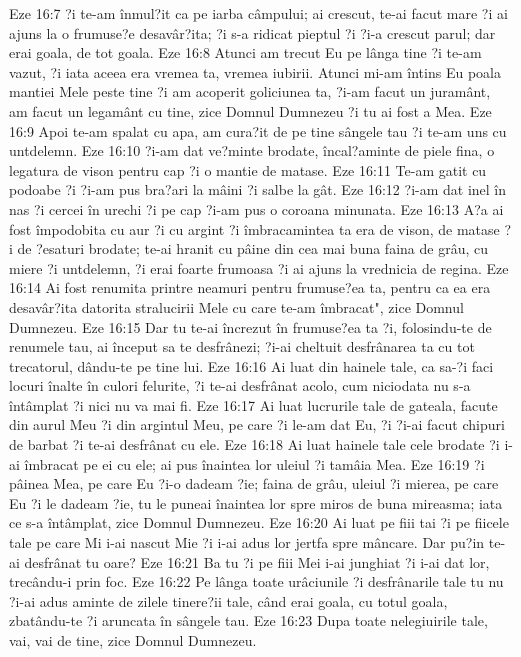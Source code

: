 Eze 16:7  ?i te-am înmul?it ca pe iarba câmpului; ai crescut, te-ai facut mare ?i ai ajuns la o frumuse?e desavâr?ita; ?i s-a ridicat pieptul ?i ?i-a crescut parul; dar erai goala, de tot goala.
Eze 16:8  Atunci am trecut Eu pe lânga tine ?i te-am vazut, ?i iata aceea era vremea ta, vremea iubirii. Atunci mi-am întins Eu poala mantiei Mele peste tine ?i am acoperit goliciunea ta, ?i-am facut un juramânt, am facut un legamânt cu tine, zice Domnul Dumnezeu ?i tu ai fost a Mea.
Eze 16:9  Apoi te-am spalat cu apa, am cura?it de pe tine sângele tau ?i te-am uns cu untdelemn.
Eze 16:10  ?i-am dat ve?minte brodate, încal?aminte de piele fina, o legatura de vison pentru cap ?i o mantie de matase.
Eze 16:11  Te-am gatit cu podoabe ?i ?i-am pus bra?ari la mâini ?i salbe la gât.
Eze 16:12  ?i-am dat inel în nas ?i cercei în urechi ?i pe cap ?i-am pus o coroana minunata.
Eze 16:13  A?a ai fost împodobita cu aur ?i cu argint ?i îmbracamintea ta era de vison, de matase ?i de ?esaturi brodate; te-ai hranit cu pâine din cea mai buna faina de grâu, cu miere ?i untdelemn, ?i erai foarte frumoasa ?i ai ajuns la vrednicia de regina.
Eze 16:14  Ai fost renumita printre neamuri pentru frumuse?ea ta, pentru ca ea era desavâr?ita datorita stralucirii Mele cu care te-am îmbracat", zice Domnul Dumnezeu.
Eze 16:15  Dar tu te-ai încrezut în frumuse?ea ta ?i, folosindu-te de renumele tau, ai început sa te desfrânezi; ?i-ai cheltuit desfrânarea ta cu tot trecatorul, dându-te pe tine lui.
Eze 16:16  Ai luat din hainele tale, ca sa-?i faci locuri înalte în culori felurite, ?i te-ai desfrânat acolo, cum niciodata nu s-a întâmplat ?i nici nu va mai fi.
Eze 16:17  Ai luat lucrurile tale de gateala, facute din aurul Meu ?i din argintul Meu, pe care ?i le-am dat Eu, ?i ?i-ai facut chipuri de barbat ?i te-ai desfrânat cu ele.
Eze 16:18  Ai luat hainele tale cele brodate ?i i-ai îmbracat pe ei cu ele; ai pus înaintea lor uleiul ?i tamâia Mea.
Eze 16:19  ?i pâinea Mea, pe care Eu ?i-o dadeam ?ie; faina de grâu, uleiul ?i mierea, pe care Eu ?i le dadeam ?ie, tu le puneai înaintea lor spre miros de buna mireasma; iata ce s-a întâmplat, zice Domnul Dumnezeu.
Eze 16:20  Ai luat pe fiii tai ?i pe fiicele tale pe care Mi i-ai nascut Mie ?i i-ai adus lor jertfa spre mâncare. Dar pu?in te-ai desfrânat tu oare?
Eze 16:21  Ba tu ?i pe fiii Mei i-ai junghiat ?i i-ai dat lor, trecându-i prin foc.
Eze 16:22  Pe lânga toate urâciunile ?i desfrânarile tale tu nu ?i-ai adus aminte de zilele tinere?ii tale, când erai goala, cu totul goala, zbatându-te ?i aruncata în sângele tau.
Eze 16:23  Dupa toate nelegiuirile tale, vai, vai de tine, zice Domnul Dumnezeu.
